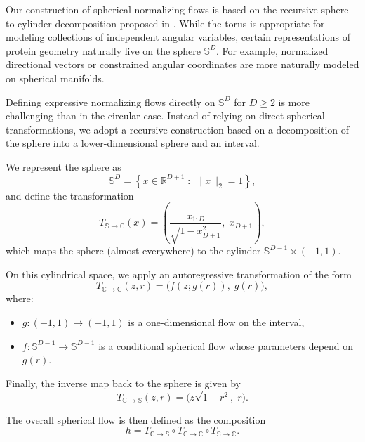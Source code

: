 \documentclass{article}
\begin{document}
Our construction of spherical normalizing flows is based on the recursive
sphere-to-cylinder decomposition proposed in \cite{Rezende2020}.
While the torus is appropriate for modeling collections of independent angular variables, certain representations of protein geometry naturally live on the sphere $\mathbb{S}^D$. For example, normalized directional vectors or constrained angular coordinates are more naturally modeled on spherical manifolds.

Defining expressive normalizing flows directly on $\mathbb{S}^D$ for $D \geq 2$ is more challenging than in the circular case. Instead of relying on direct spherical transformations, we adopt a recursive construction based on a decomposition of the sphere into a lower-dimensional sphere and an interval.

We represent the sphere as
\[
\mathbb{S}^D = \left\{ x \in \mathbb{R}^{D+1} \;:\; \|x\|_2 = 1 \right\},
\]
and define the transformation
\begin{equation}
T_{\mathbb{S} \to \mathbb{C}}(x) = \left( \frac{x_{1:D}}{\sqrt{1 - x_{D+1}^2}}, \; x_{D+1} \right),
\end{equation}
which maps the sphere (almost everywhere) to the cylinder $\mathbb{S}^{D-1} \times (-1, 1)$.

On this cylindrical space, we apply an autoregressive transformation of the form
\begin{equation}
T_{\mathbb{C} \to \mathbb{C}}(z, r) = \big( f(z; g(r)), \; g(r) \big),
\end{equation}
where:
\begin{itemize}
\item $g : (-1,1) \to (-1,1)$ is a one-dimensional flow on the interval,
\item $f : \mathbb{S}^{D-1} \to \mathbb{S}^{D-1}$ is a conditional spherical flow whose parameters depend on $g(r)$.
\end{itemize}

Finally, the inverse map back to the sphere is given by
\begin{equation}
T_{\mathbb{C} \to \mathbb{S}}(z, r) = \big( z \sqrt{1 - r^2}, \; r \big).
\end{equation}

The overall spherical flow is then defined as the composition
\begin{equation}
h = T_{\mathbb{C} \to \mathbb{S}} \circ T_{\mathbb{C} \to \mathbb{C}} \circ T_{\mathbb{S} \to \mathbb{C}}.
\end{equation}
\end{document}
